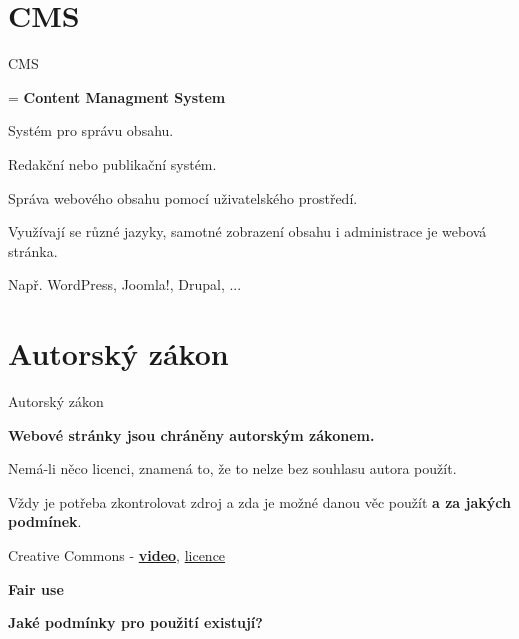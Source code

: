 \documentclass[aspectratio=169]{beamer}
\begin{document}
\section{CMS}

\begin{frame}{CMS}
    \begin{cardTiny}
        \begin{flushleft}
            = \textbf{Content Managment System}

            Systém pro správu obsahu.

            Redakční nebo publikační systém.

            Správa webového obsahu pomocí uživatelského prostředí.

            Využívají se různé jazyky, samotné zobrazení obsahu i administrace je webová stránka.

            Např. WordPress, Joomla!, Drupal, ...
        \end{flushleft}
    \end{cardTiny}
\end{frame}



\section{Autorský zákon}

\begin{frame}{Autorský zákon}
    \begin{cardTiny}
        \begin{flushleft}
            \textbf{Webové stránky jsou chráněny autorským zákonem.}

            \vspace{2ex}
            Nemá-li něco licenci, znamená to, že to nelze bez souhlasu autora použít.

            Vždy je potřeba zkontrolovat zdroj a zda je možné danou věc použít \textbf{a za jakých podmínek}.

            \vspace{2ex}
            Creative Commons - \textbf{\href{https://www.youtube.com/watch?v=4ZvJGV6YF6Y}{video}}, \href{https://creativecommons.org/licenses/?lang=cs}{licence}
            
            \vspace{2ex}
            \textbf{Fair use}
        \end{flushleft}
    \end{cardTiny}
    \begin{cardTiny}
        \begin{center}
            \textbf{Jaké podmínky pro použití existují?}
        \end{center}
    \end{cardTiny}
\end{frame}
\end{document}
